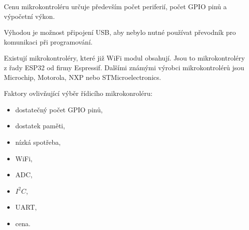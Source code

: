 Cenu mikrokontroléru určuje především počet periferií, počet GPIO pinů a výpočetní výkon.

Výhodou je možnost připojení USB, aby nebylo nutné používat převodník pro komunikaci při programování. 

Existují mikrokontroléry, které již WiFi modul obsahují. Jsou to mikrokontroléry z řady ESP32 od firmy Espressif. Dalšími známými výrobci mikrokontrolérů jsou Microchip,
Motorola, NXP nebo STMicroelectronics. 

Faktory ovlivňující výběr řídicího mikrokonroléru:
\begin{itemize}
  \item dostatečný počet GPIO pinů,
  \item dostatek paměti,
  \item nízká spotřeba,
  \item WiFi,
  \item ADC,
  \item $I^2C$,
  \item UART,
  \item cena.
\end{itemize}







